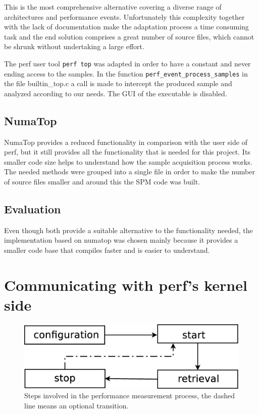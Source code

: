 This is the most comprehensive alternative covering a diverse range of architectures and performance events. Unfortunately this complexity together with the lack of documentation make the adaptation process a time consuming task and the end solution comprises a great number of source files, which cannot be shrunk without undertaking a large effort. 

The perf user tool \texttt{perf top} was adapted in order to have a constant and never ending access to the samples. In the function \texttt{perf\_event\_process\_samples} in the file builtin\_top.c a call is made to intercept the produced sample and analyzed according to our needs. The GUI of the executable is disabled.

\subsection{NumaTop}\label{section:numatop}
NumaTop provides a reduced functionality in comparison with the user side of perf, but it still provides all the functionality that is needed for this project. Its smaller code size helps to understand how the sample acquisition process works. The needed methods were grouped into a single file in order to make the number of source files smaller and around this the SPM code was built.

\subsection{Evaluation}\label{section:sol-evltn}
Even though both provide a suitable alternative to the functionality needed, the implementation based on numatop was chosen mainly because it provides a smaller code base that compiles faster and is easier to understand. 

\section{Communicating with perf's kernel side}\label{section:ovv-perfks}

\begin{figure}
	\centering
		\includegraphics[width=.7\textwidth]{figures/sampling-process.eps}
		\caption[Steps of the performance measurement process]{Steps involved in the performance measurement process, the dashed line means an optional transition.}
		\label{fig:sprocess}
\end{figure}

